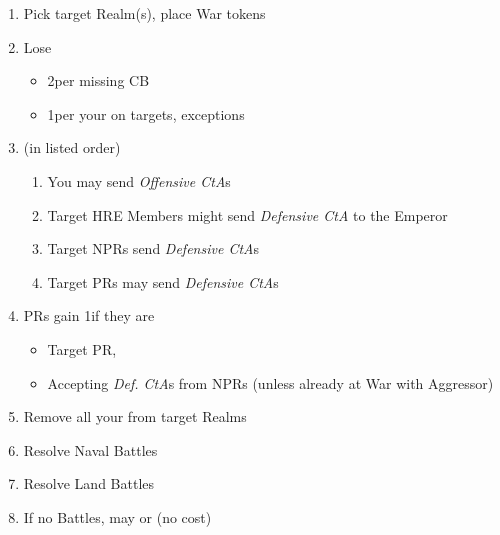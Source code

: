 \documentclass[10pt]{article}
\begin{document}
\begin{enumerate}
	\item Pick target Realm(s), place War tokens
	\item Lose \stability
	\begin{itemize}
		\item {}2\stability per missing CB
		\item 1\stability per your \marriage on targets, exceptions
	\end{itemize}
	\item {} (in listed order)
	\begin{enumerate}[label=\alph*.]
		\item You may send \emph{Offensive CtA}s
		\item {}Target HRE Members might send \emph{Defensive CtA} to the Emperor
		\item Target NPRs send \emph{Defensive CtA}s
		\item Target PRs may send \emph{Defensive CtA}s
	\end{enumerate}
	\item PRs gain 1\milpower if they are
	\begin{itemize}
		\item Target PR, 
		\item Accepting \emph{Def. CtA}s from NPRs (unless already at War with Aggressor)
	\end{itemize}
	\item Remove all your \influence from target Realms
	\item Resolve Naval Battles
	\item Resolve Land Battles
	\item If no Battles, may  or  (no \milpower cost)
\end{enumerate}
\end{document}
